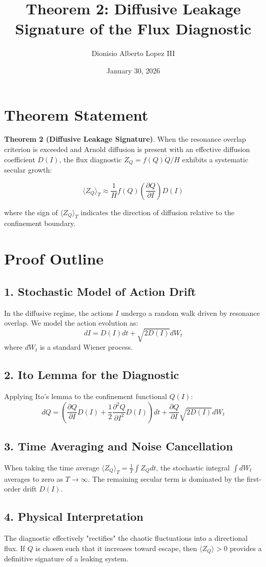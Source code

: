 \documentclass{article}
\title{Theorem 2: Diffusive Leakage Signature of the Flux Diagnostic}
\author{Dionisio Alberto Lopez III}
\date{January 30, 2026}
\begin{document}
\maketitle

\section{Theorem Statement}

\textbf{Theorem 2 (Diffusive Leakage Signature)}. 
When the resonance overlap criterion is exceeded and Arnold diffusion is present with an effective diffusion coefficient $D(I)$, the flux diagnostic $Z_Q = f(Q) \dot{Q} / H$ exhibits a systematic secular growth:

\begin{equation}
\langle Z_Q \rangle_T \approx \frac{1}{H} f(Q) \left( \frac{\partial Q}{\partial I} \right) D(I)
\end{equation}

where the sign of $\langle Z_Q \rangle_T$ indicates the direction of diffusion relative to the confinement boundary.

\section{Proof Outline}

\subsection{1. Stochastic Model of Action Drift}
In the diffusive regime, the actions $I$ undergo a random walk driven by resonance overlap. We model the action evolution as:
\begin{equation}
dI = D(I) dt + \sqrt{2 D(I)} dW_t
\end{equation}
where $dW_t$ is a standard Wiener process.

\subsection{2. Ito Lemma for the Diagnostic}
Applying Ito's lemma to the confinement functional $Q(I)$:
\begin{equation}
dQ = \left( \frac{\partial Q}{\partial I} D(I) + \frac{1}{2} \frac{\partial^2 Q}{\partial I^2} D(I) \right) dt + \frac{\partial Q}{\partial I} \sqrt{2 D(I)} dW_t
\end{equation}

\subsection{3. Time Averaging and Noise Cancellation}
When taking the time average $\langle Z_Q \rangle_T = \frac{1}{T} \int Z_Q dt$, the stochastic integral $\int dW_t$ averages to zero as $T \to \infty$. The remaining secular term is dominated by the first-order drift $D(I)$.

\subsection{4. Physical Interpretation}
The diagnostic effectively "rectifies" the chaotic fluctuations into a directional flux. If $Q$ is chosen such that it increases toward escape, then $\langle Z_Q \rangle > 0$ provides a definitive signature of a leaking system.
\end{document}
